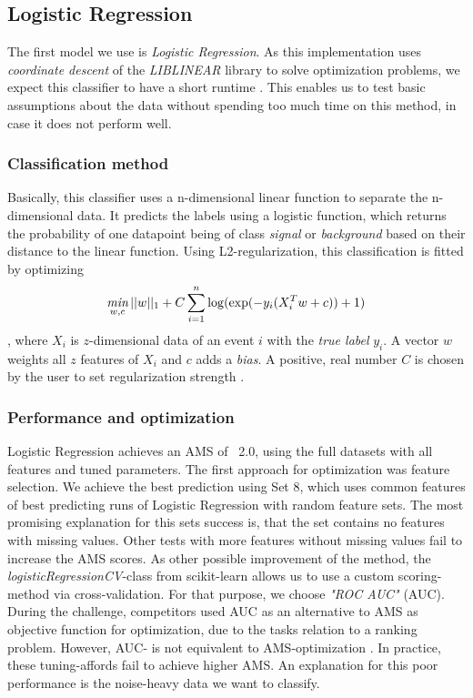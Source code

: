 \subsection{Logistic Regression}\label{sec:logReg}
The first model we use is \emph{Logistic Regression}. As this implementation uses \emph{coordinate descent} of the \emph{LIBLINEAR} library to solve optimization problems, we expect this classifier to have a short runtime \cite{cdl2}. This enables us to test basic assumptions about the data without spending too much time on this method, in case it does not perform well.

\subsubsection{Classification method}
Basically, this classifier uses a n-dimensional linear function to separate the n-dimensional data. It predicts the labels using a logistic function, which returns the probability of one datapoint being of class \emph{signal} or \emph{background} based on their distance to the linear function.
Using  L2-regularization, this classification is fitted by optimizing \begin{equation}
	\label{l2}
	\operatorname*{\emph{min}}_{w,c} ||w||_1 + C \sum\limits_{i=1}^{n}\log(\exp(-y_i(X_i^{T} w + c )) + 1)
\end{equation}, where $X_i$ is $z$-dimensional data of an event $i$ with the \emph{true label} $y_i$. A vector $w$ weights all $z$ features of $X_i$ and $c$ adds a \emph{bias}. A positive, real number $C$ is chosen by the user to set regularization strength \cite{sklearn}.

\subsubsection{Performance and optimization}
Logistic Regression achieves an AMS of ~2.0, using the full datasets with all features and tuned parameters. The first approach for optimization was feature selection. We achieve the best prediction using Set 8, which uses common features of best predicting runs of Logistic Regression with random feature sets. The most promising explanation for this sets success is, that the set contains no features with missing values. Other tests with more features without missing values fail to increase the AMS scores. As other possible improvement of the method, the \emph{logisticRegressionCV}-class from scikit-learn allows us to use a custom scoring-method via cross-validation. For that purpose, we choose \emph{"ROC AUC"} (AUC). During the challenge, competitors used AUC as an alternative to AMS as objective function for optimization, due to the tasks relation to a ranking problem. However, AUC- is not equivalent to AMS-optimization \cite{cowa14}.
In practice, these tuning-affords fail to achieve higher AMS. An explanation for this poor performance is the noise-heavy data we want to classify.